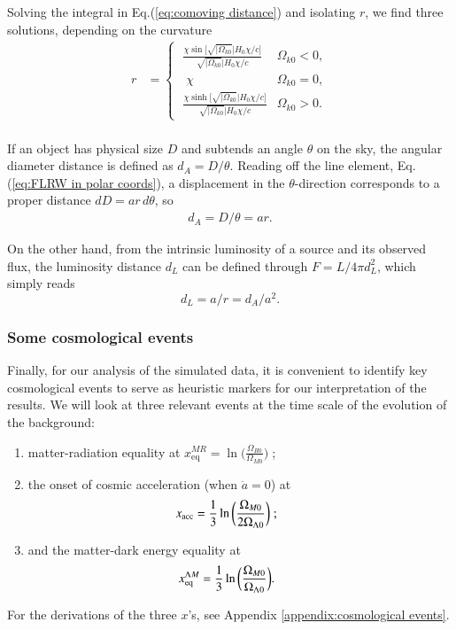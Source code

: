 \documentclass[twocolumn]{aa}
\begin{document}
Solving the integral in Eq.(\ref{eq:comoving distance}) and isolating $r$, we find three solutions, depending on the curvature 
\begin{align*}
r &= \begin{cases}
\displaystyle \;  \frac{\chi\sin \Big[\sqrt{|\Omega_{k 0}}| H_0 \chi /c\Big]}{\sqrt{|\Omega_{k 0}}| H_0 \chi /c} & \Omega_{k 0} < 0,\\[2mm]
\displaystyle \;\;\chi & \Omega_{k 0} =0, \\[2mm]
\displaystyle \; \frac{\chi\sinh \Big[\sqrt{|\Omega_{k 0}}| H_0 \chi /c\Big] }{\sqrt{|\Omega_{k 0}}| H_0 \chi /c} & \Omega_{k 0} > 0.
\end{cases}
\end{align*}\\


If an object has physical size $D$ and subtends an angle $\theta$ on the sky, the angular diameter distance is defined as $d_A = D/\theta$. Reading off the line element, Eq.(\ref{eq:FLRW in polar coords}), a displacement in the $\theta$-direction corresponds to a proper distance $dD = ar\,d\theta$, so
\begin{align*}
      d_A = D/\theta = ar.
\end{align*}

On the other hand, from the intrinsic luminosity of a source and its observed flux, the luminosity distance $d_L$ can be defined through $F = L/4\pi d_L^2$, which simply reads 
\begin{equation*}
      d_L = a/r = d_A/a^2.
\end{equation*}

\subsubsection{Some cosmological events}

Finally, for our analysis of the simulated data, it is convenient to identify key cosmological events to serve as heuristic markers for our interpretation of the results. We will look at three relevant events at the time scale of the evolution of the background:
\begin{enumerate}[label=(\roman*), leftmargin=12mm]
      \item matter-radiation equality at $\displaystyle x^{MR}_\text{eq} = \ln\bigg(\frac{\Omega_{R0}}{\Omega_{M0}}\bigg)\;$;\\
      \item the onset of cosmic acceleration (when $\ddot{a}=0$) at $$\hspace{-8mm} x_\text{acc} = \frac{1}{3}\ln\bigg(\frac{\Omega_{M0}}{2\Omega_{\Lambda 0}}\bigg)\;;$$
      \item and the matter-dark energy equality at $$ \hspace{-8mm}x^{\Lambda M}_\text{eq} = \frac{1}{3}\ln\bigg(\frac{\Omega_{M0}}{\Omega_{\Lambda 0}}\bigg).$$
\end{enumerate}
For the derivations of the three $x$'s, see Appendix \ref{appendix:cosmological events}.
\end{document}
